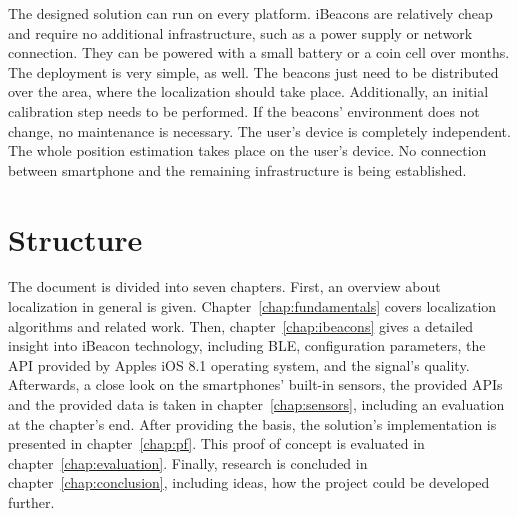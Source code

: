 The designed solution can run on every platform. iBeacons are relatively cheap and require no additional infrastructure, such as a power supply or network connection. They can be powered with a small battery or a coin cell over months. The deployment is very simple, as well. The beacons just need to be distributed over the area, where the localization should take place. Additionally, an initial calibration step needs to be performed. If the beacons' environment does not change, no maintenance is necessary. The user's device is completely independent. The whole position estimation takes place on the user's device. No connection between smartphone and the remaining infrastructure is being established.


\section{Structure}
The document is divided into seven chapters. First, an overview about localization in general is given. Chapter~\ref{chap:fundamentals} covers localization algorithms and related work. Then, chapter~\ref{chap:ibeacons} gives a detailed insight into iBeacon technology, including \acl{BLE}, configuration parameters, the \ac{API} provided by Apples iOS 8.1 operating system, and the signal's quality. Afterwards, a close look on the smartphones' built-in sensors, the provided \acsp{API} and the provided data is taken in chapter~\ref{chap:sensors}, including an evaluation at the chapter's end. After providing the basis, the solution's implementation is presented in chapter~\ref{chap:pf}. This proof of concept is evaluated in chapter~\ref{chap:evaluation}. Finally, research is concluded in chapter~\ref{chap:conclusion}, including ideas, how the project could be developed further.

